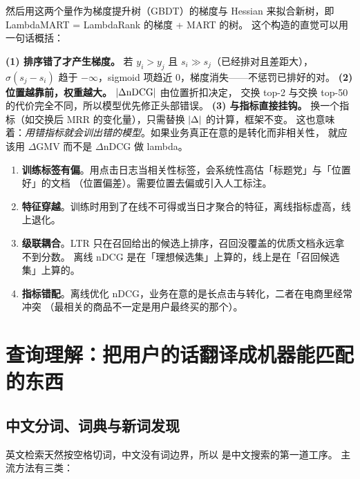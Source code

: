 然后用这两个量作为梯度提升树（GBDT）的梯度与 Hessian 来拟合新树，即 LambdaMART = LambdaRank 的梯度 + MART 的树。
这个构造的直觉可以用一句话概括：

\begin{keypoint}
\textbf{(1) 排序错了才产生梯度。} 若 $y_i > y_j$ 且 $s_i \gg s_j$（已经排对且差距大），
$\sigma(s_j - s_i)$ 趋于 $-\infty$，sigmoid 项趋近 0，梯度消失——不惩罚已排好的对。
\textbf{(2) 位置越靠前，权重越大。} $\left\lvert \Delta \text{nDCG} \right\rvert$ 由位置折扣决定，
交换 top-2 与交换 top-50 的代价完全不同，所以模型优先修正头部错误。
\textbf{(3) 与指标直接挂钩。} 换一个指标（如交换后 MRR 的变化量），只需替换 $\left\lvert \Delta \right\rvert$ 的计算，框架不变。
这也意味着：\emph{用错指标就会训出错的模型}。如果业务真正在意的是转化而非相关性，
就应该用 $\Delta$GMV 而不是 $\Delta$nDCG 做 lambda。
\end{keypoint}

\begin{pitfall}
\begin{enumerate}
  \item \textbf{训练标签有偏}。用点击日志当相关性标签，会系统性高估「标题党」与「位置好」的文档
        （位置偏差\cite{varian2007position}）。需要位置去偏或引入人工标注。
  \item \textbf{特征穿越}。训练时用到了在线不可得或当日才聚合的特征，离线指标虚高，线上退化。
  \item \textbf{级联耦合}。LTR 只在召回给出的候选上排序，召回没覆盖的优质文档永远拿不到分数。
        离线 nDCG 是在「理想候选集」上算的，线上是在「召回候选集」上算的。
  \item \textbf{指标错配}。离线优化 nDCG，业务在意的是长点击与转化，二者在电商里经常冲突
        （最相关的商品不一定是用户最终买的那个）。
\end{enumerate}
\end{pitfall}

\section{查询理解：把用户的话翻译成机器能匹配的东西}
\label{sec:search-qu}

\subsection{中文分词、词典与新词发现}

英文检索天然按空格切词，中文没有词边界，所以 是中文搜索的第一道工序。
主流方法有三类：

